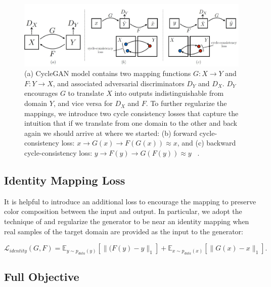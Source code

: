 \begin{figure}[H]
	    \begin{center} \includegraphics[scale=0.5]{images/CycleGAN.jpg}
	    \caption[CycleGAN Model Mapping Functions.]{(a) CycleGAN model contains two mapping functions $G : X \rightarrow Y$ and $F : Y \rightarrow X$, and associated adversarial discriminators $D_Y$ and $D_X$. $D_Y$ encourages $G$ to translate $X$ into outputs indistinguishable from domain $Y$, and vice versa for $D_X$ and $F$. To further regularize the mappings, we introduce two cycle consistency losses that capture the intuition that if we translate from one domain to the other and back again we should arrive at where we started: (b) forward cycle-consistency loss: $x \rightarrow G(x) \rightarrow F(G(x)) \approx x$, and (c) backward cycle-consistency loss: $y \rightarrow F(y) \rightarrow G(F(y)) \approx y$ ~\cite{zhu2020unpaired}.}
	    \label{fig:CycleGAN}
	    \end{center}
\end{figure}

\subsection{Identity Mapping Loss}

It is helpful to introduce an additional loss to encourage the mapping to preserve color composition between the input and output. In particular, we adopt the technique of \cite{taigman2016unsupervised} and regularize the generator to be near an identity mapping when real samples of the target domain are provided as the input to the generator:

\begin{equation}\label{IdentityMappingLoss}
    \mathcal{L}_{identity}(G, F) = \mathbb{E}_{y \sim p_{data}(y)}[\|(F(y) - y\|_1] + \mathbb{E}_{x \sim p_{data}(x)}[\|G(x) - x\|_1]. 
    \end{equation}

\subsection{Full Objective}

